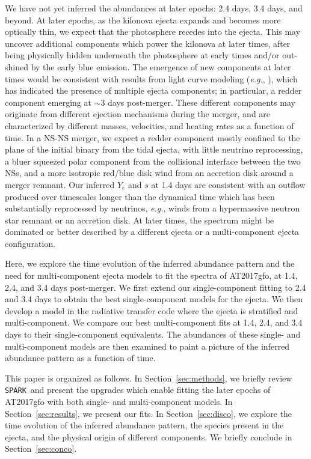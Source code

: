 \documentclass[twocolumn,twocolappendix]{aastex63}
\def\SPARK{\texttt{SPARK}}
\def\eg{{\it e.g.}}
\begin{document}
We have not yet inferred the abundances at later epochs: 2.4 days, 3.4 days, and beyond. At later epochs, as the kilonova ejecta expands and becomes more optically thin, we expect that the photosphere recedes into the ejecta. This may uncover additional components which power the kilonova at later times, after being physically hidden underneath the photosphere at early times and/or out-shined by the early blue emission. The emergence of new components at later times would be consistent with results from light curve modeling (\eg, \citealt{villar17}), which has indicated the presence of multiple ejecta components; in particular, a redder component emerging at $\sim$3 days post-merger. These different components may originate from different ejection mechanisms during the merger, and are characterized by different masses, velocities, and heating rates as a function of time. In a NS-NS merger, we expect a redder component mostly confined to the plane of the initial binary from the tidal ejecta, with little neutrino reprocessing, a bluer squeezed polar component from the collisional interface between the two NSs, and a more isotropic red/blue disk wind from an accretion disk around a merger remnant. Our inferred $Y_e$ and $s$ at 1.4 days are consistent with an outflow produced over timescales longer than the dynamical time which has been substantially reprocessed by neutrinos, \eg, winds from a hypermassive neutron star remnant or an accretion disk. At later times, the spectrum might be dominated or better described by a different ejecta or a multi-component ejecta configuration. 

Here, we explore the time evolution of the inferred abundance pattern and the need for multi-component ejecta models to fit the spectra of AT2017gfo, at 1.4, 2.4, and 3.4 days post-merger. We first extend our single-component fitting to 2.4 and 3.4 days to obtain the best single-component models for the ejecta. We then develop a model in the radiative transfer code where the ejecta is stratified and multi-component. We compare our best multi-component fits at 1.4, 2.4, and 3.4 days to their single-component equivalents. The abundances of these single- and multi-component models are then examined to paint a picture of the inferred abundance pattern as a function of time. 

This paper is organized as follows. In Section~\ref{sec:methods}, we briefly review \SPARK~and present the upgrades which enable fitting the later epochs of AT2017gfo with both single- and multi-component models. In Section~\ref{sec:results}, we present our fits. In Section~\ref{sec:disco}, we explore the time evolution of the inferred abundance pattern, the species present in the ejecta, and the physical origin of different components. We briefly conclude in Section~\ref{sec:conco}.
\end{document}
